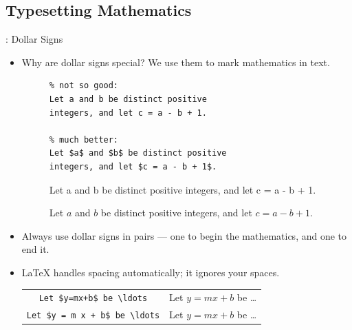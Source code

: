 \documentclass[aspectratio=169]{beamer}
\begin{document}

\subsection{Typesetting Mathematics}
\begin{frame}[fragile]{\insertsubsection{}: Dollar Signs}
    \begin{itemize}
        \item Why are dollar signs \keystrokebftt{\$} special? We use them to mark mathematics in text.\\[1ex]
              \begin{figure}
                  \begin{minipage}{0.5\textwidth}
                      \begin{lstlisting}
% not so good:
Let a and b be distinct positive
integers, and let c = a - b + 1.

% much better:
Let $a$ and $b$ be distinct positive
integers, and let $c = a - b + 1$.
                    \end{lstlisting}
                  \end{minipage}
                  \begin{minipage}{0.35\textwidth}
                      Let a and b be distinct positive
                      integers, and let c = a - b + 1.

                      Let $a$ and $b$ be distinct positive
                      integers, and let $c = a - b + 1$.
                  \end{minipage}
              \end{figure}
        \item Always use dollar signs in pairs --- one to begin the mathematics, and one
              to end it.
        \item \LaTeX{} handles spacing automatically; it ignores your spaces.
              \begin{table}
                  \begin{tabular}{cl}
                      \verb|Let $y=mx+b$ be \ldots|      & Let $y=mx+b$ be \ldots      \\
                      \verb|Let $y = m x + b$ be \ldots| & Let $y = m x + b$ be \ldots
                  \end{tabular}
              \end{table}
    \end{itemize}
\end{frame}
\end{document}
